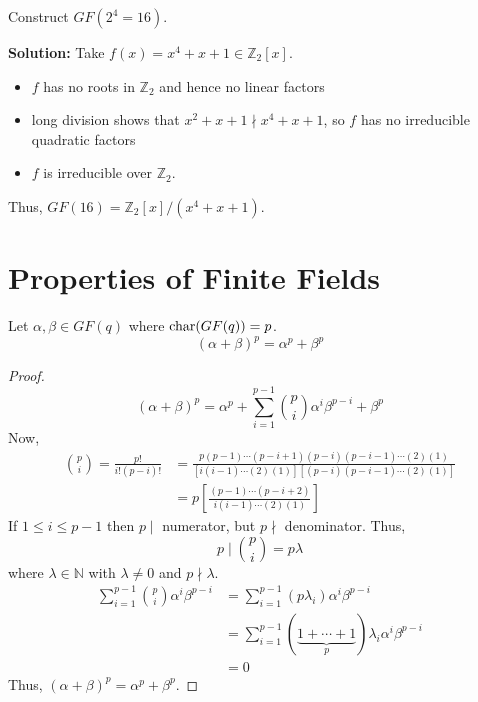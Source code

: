 
\begin{exbox}
    \begin{example}
        Construct $ GF(2^4=16) $.

        \textbf{Solution:} Take $ f(x)=x^4+x+1\in\mathbb{Z}_2[x] $.
        \begin{itemize}
            \item $ f $ has no roots in $ \mathbb{Z}_2 $ and hence no linear factors
            \item long division shows that $ x^2+x+1\nmid x^4+x+1 $, so $ f $
                  has no irreducible quadratic factors
            \item $ f $ is irreducible over $ \mathbb{Z}_2 $.
        \end{itemize}
        Thus, $ GF(16)=\mathbb{Z}_2[x]/(x^4+x+1) $.
    \end{example}
\end{exbox}

\section{Properties of Finite Fields}
\begin{thmbox}
    \begin{theorem}
        Let $ \alpha,\beta\in GF(q) $ where $ \operatorname{char}(GF(q))=p $.
        \[ (\alpha + \beta)^p=\alpha^p+\beta^p \]
    \end{theorem}
\end{thmbox}

\begin{proof}
    \[ (\alpha + \beta)^p=\alpha^p+\sum\limits_{i=1}^{p-1}
        \binom{p}{i}\alpha^i\beta^{p-i}+\beta^p \]
    Now,
    \begin{align*}
        \binom{p}{i}=\frac{p!}{i!(p-i)!}
         & =\frac{p(p-1)\cdots (p-i+1)(p-i)(p-i-1)\cdots (2)(1)}{\left[i(i-1)\cdots(2)(1)\right]\left[(p-i)(p-i-1)\cdots(2)(1)\right]} \\
         & =p\left[\frac{(p-1)\cdots (p-i+2)}{i(i-1)\cdots(2)(1)}\right]
    \end{align*}
    If $ 1\leqslant i\leqslant p-1 $ then $ p\mid $ numerator, but
    $ p \nmid $ denominator. Thus,
    \[ p\mid \binom{p}{i}=p\lambda \]
    where $ \lambda\in\mathbb{N} $ with $ \lambda \neq 0 $ and $ p\nmid \lambda $.
    \begin{align*}
        \sum\limits_{i=1}^{p-1}\binom{p}{i}\alpha^i\beta^{p-i}
         & = \sum\limits_{i=1}^{p-1} (p\lambda_i) \alpha^i\beta^{p-i}                          \\
         & =\sum\limits_{i=1}^{p-1} (\underbrace{1+\cdots+1}_{p})\lambda_i \alpha^i\beta^{p-i} \\
         & =0
    \end{align*}
    Thus, $ (\alpha + \beta)^p=\alpha^p+\beta^p $.
\end{proof}

